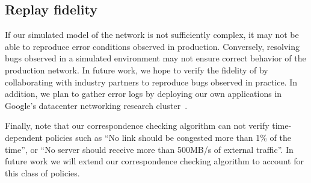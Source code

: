 \subsection{Replay fidelity}

If our simulated model of the network is not sufficiently complex, it may not
be able to reproduce error conditions observed in production. Conversely,
resolving bugs observed in a simulated environment may not ensure
correct behavior of the production network. In future work, we hope to verify
the fidelity of \simulator{} by collaborating with industry partners to
reproduce bugs observed in practice. In addition, we
plan to gather error logs by deploying our own applications in Google's
datacenter networking research cluster~\cite{DNRC}.

Finally, note that our correspondence checking algorithm can not verify 
time-dependent policies such as ``No link should be congested more than 1\% of the
time'', or ``No server should receive more than 500MB/s of external traffic''.
In future work we will extend our correspondence checking algorithm to
account for this class of policies.

